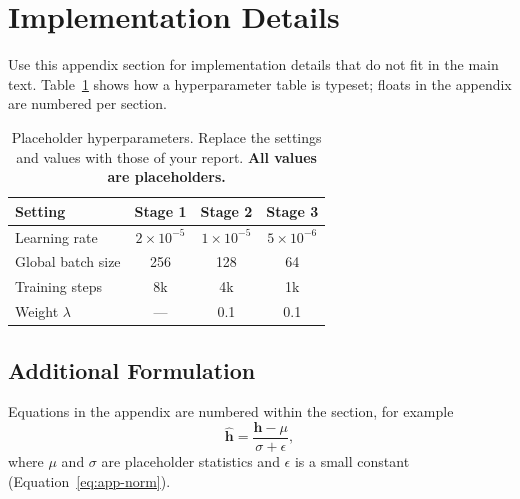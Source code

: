 \ogbeginappendix

\section{Implementation Details}
\label{app:details}

Use this appendix section for implementation details that do not fit in the
main text. Table~\ref{tab:app-hparams} shows how a hyperparameter table is
typeset; floats in the appendix are numbered per section.

\begin{table}[!htbp]
  \centering
  \footnotesize
  \caption{Placeholder hyperparameters. Replace the settings and values with
  those of your report. \textbf{All values are placeholders.}}
  \label{tab:app-hparams}
  \begin{tabularx}{\linewidth}{>{\raggedright\arraybackslash}Xccc}
    \toprule
    Setting & Stage 1 & Stage 2 & Stage 3 \\
    \midrule
    Learning rate     & $2\times10^{-5}$ & $1\times10^{-5}$ & $5\times10^{-6}$ \\
    Global batch size & 256  & 128  & 64   \\
    Training steps    & 8k   & 4k   & 1k   \\
    Weight $\lambda$  & ---  & 0.1  & 0.1  \\
    \bottomrule
  \end{tabularx}
\end{table}

\subsection{Additional Formulation}

Equations in the appendix are numbered within the section, for example
\begin{equation}
  \hat{\mathbf{h}} = \frac{\mathbf{h} - \mu}{\sigma + \epsilon},
  \label{eq:app-norm}
\end{equation}
where $\mu$ and $\sigma$ are placeholder statistics and $\epsilon$ is a small
constant (Equation~\eqref{eq:app-norm}).


